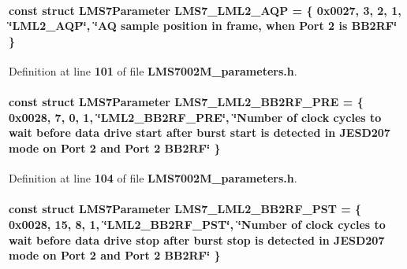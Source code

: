 \paragraph[{L\+M\+S7\+\_\+\+L\+M\+L2\+\_\+\+A\+QP}]{\setlength{\rightskip}{0pt plus 5cm}const struct {\bf L\+M\+S7\+Parameter} L\+M\+S7\+\_\+\+L\+M\+L2\+\_\+\+A\+QP = \{ 0x0027, 3, 2, 1, \char`\"{}\+L\+M\+L2\+\_\+\+A\+Q\+P\char`\"{}, \char`\"{}\+A\+Q sample position in frame, when Port 2 is B\+B2\+R\+F\char`\"{} \}\hspace{0.3cm}{\ttfamily [static]}}\label{LMS7002M__parameters_8h_a4d961bd3004287e8405a9094a64b5d65}


Definition at line {\bf 101} of file {\bf L\+M\+S7002\+M\+\_\+parameters.\+h}.

\paragraph[{L\+M\+S7\+\_\+\+L\+M\+L2\+\_\+\+B\+B2\+R\+F\+\_\+\+P\+RE}]{\setlength{\rightskip}{0pt plus 5cm}const struct {\bf L\+M\+S7\+Parameter} L\+M\+S7\+\_\+\+L\+M\+L2\+\_\+\+B\+B2\+R\+F\+\_\+\+P\+RE = \{ 0x0028, 7, 0, 1, \char`\"{}\+L\+M\+L2\+\_\+\+B\+B2\+R\+F\+\_\+\+P\+R\+E\char`\"{}, \char`\"{}\+Number of clock cycles to wait before data drive start after burst start is detected in J\+E\+S\+D207 mode on Port 2 and Port 2 B\+B2\+R\+F\char`\"{} \}\hspace{0.3cm}{\ttfamily [static]}}\label{LMS7002M__parameters_8h_a1f7fa1bc3edd25be78c8bfbc9ad71e6c}


Definition at line {\bf 104} of file {\bf L\+M\+S7002\+M\+\_\+parameters.\+h}.

\paragraph[{L\+M\+S7\+\_\+\+L\+M\+L2\+\_\+\+B\+B2\+R\+F\+\_\+\+P\+ST}]{\setlength{\rightskip}{0pt plus 5cm}const struct {\bf L\+M\+S7\+Parameter} L\+M\+S7\+\_\+\+L\+M\+L2\+\_\+\+B\+B2\+R\+F\+\_\+\+P\+ST = \{ 0x0028, 15, 8, 1, \char`\"{}\+L\+M\+L2\+\_\+\+B\+B2\+R\+F\+\_\+\+P\+S\+T\char`\"{}, \char`\"{}\+Number of clock cycles to wait before data drive stop after burst stop is detected in J\+E\+S\+D207 mode on Port 2 and Port 2 B\+B2\+R\+F\char`\"{} \}\hspace{0.3cm}{\ttfamily [static]}}\label{LMS7002M__parameters_8h_a356d829dc1a1f5894140d5a2ee1dec43}


